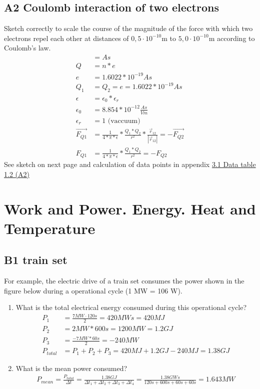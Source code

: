 \documentclass[10pt,ngerman]{scrartcl}
\begin{document}
\subsection{A2 Coulomb interaction of two electrons}
Sketch correctly to scale the course of the magnitude of the force with which two electrons repel each other at distances of $0,5 \cdot 10^{-10}$m to $5,0 \cdot 10^{-10}$m according to Coulomb's law.
\begin{align*}
	[Q] &= As \\
	Q &= n * e \\
	e &= 1.6022 * 10^{-19} As \\
	Q_{1} &= Q_{2} = e = 1.6022 * 10^{-19} As \\
	\epsilon &= \epsilon_{0} * \epsilon_{r} \\
	\epsilon_{0} &= 8.854 * 10^{-12} \frac{As}{Vm} \\
	\epsilon_{r} &= 1 \text{ (vaccuum)}\\
	\vec{F_{Q1}} &= \frac{1}{4 * \pi * \epsilon } * \frac{Q_{1}*Q_{2}}{r^{2}} * \frac{\vec{r}_{12}}{|\vec{r}_{12}|} = -\vec{F_{Q2}} \\
	F_{Q1} &= \frac{1}{4 * \pi * \epsilon } * \frac{Q_{1}*Q_{2}}{r^{2}} = -F_{Q2}
\end{align*}
See sketch on next page and calculation of data points in appendix \hyperref[sec:data-table-a2]{3.1 Data table 1.2 (A2)}

\begin{landscape}
 
\end{landscape}

\newpage
\section{Work and Power. Energy. Heat and Temperature}
\subsection{B1 train set}
For example, the electric drive of a train set consumes the power shown in the figure below during a operational cycle (1 MW = 106 W).

\begin{enumerate}
	\item What is the total electrical energy consumed during this operational cycle?
	\begin{align}
		P_{1} &= \frac{7MW\cdot 120s}{2} = 420MWs = 420MJ\\
		P_{2} &= 2 MW * 600s = 1200 MW = 1.2 GJ\\
		P_{3} &= \frac{-7MW * 60s}{2} = -240 MW\\
		P_{total} &= P_{1} + P_{2} + P_{3} = 420MJ + 1.2 GJ - 240 MJ = 1.38 GJ
	\end{align}
	\item What is the mean power consumed?
	\begin{align}
        P_{mean} = \frac{P_{total}}{\Delta t} = \frac{1.38 GJ}{\Delta t_{1} +\Delta t_{2} +\Delta t_{3} +\Delta t_{4}}
		= \frac{1.38GWs}{120s + 600s + 60s + 60s} = 1.643MW
    \end{align}
\end{enumerate}
\end{document}
